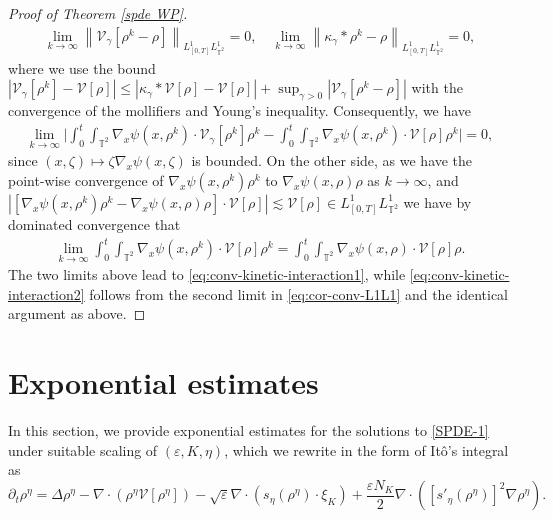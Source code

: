 \begin{proof}[Proof of Theorem \ref{spde WP}]
\begin{align}
\lim_{k \to \infty} \left\|\mathcal{V}_{\gamma}[\rho^k - \rho]\right\|_{L^1_{[0,T]}L^1_{\mathbb{T}^2}} = 0, \quad \lim_{k \to \infty} \left\|\kappa_{\gamma} \ast \rho^k - \rho\right\|_{L^1_{[0,T]}L^1_{\mathbb{T}^2}} = 0,
\end{align}
where we use the bound $|\mathcal{V}_{\gamma}[\rho^k] - \mathcal{V}[\rho]| \leq |\kappa_{\gamma} \ast \mathcal{V}[\rho] - \mathcal{V}[\rho]| + \sup_{\gamma > 0}|\mathcal{V}_{\gamma}[\rho^k - \rho]|$ with the convergence of the mollifiers and Young's inequality. Consequently, we have
\begin{align*}
\lim_{k \to \infty}\Big|\int_{0}^{t} \int_{\mathbb{T}^2} \nabla_x\psi(x, \rho^k)  \cdot \mathcal{V}_{\gamma}[\rho^k] \rho^k  - \int_{0}^{t} \int_{\mathbb{T}^2} \nabla_x\psi(x, \rho^k)  \cdot \mathcal{V}[\rho] \rho^k\Big| = 0,
\end{align*}
since $(x, \zeta) \mapsto \zeta \nabla_x\psi(x, \zeta)$ is bounded. On the other side, as we have the point-wise convergence of $\nabla_x\psi(x, \rho^k) \rho^k$ to $\nabla_x\psi(x, \rho) \rho$ as $k \to \infty$, and $\left|\left[\nabla_x\psi(x, \rho^k) \rho^k - \nabla_x\psi(x, \rho) \rho\right] \cdot \mathcal{V}[\rho]\right| \lesssim \mathcal{V}[\rho] \in L^1_{[0,T]}L^1_{\mathbb{T}^2}$
we have by dominated convergence that
\begin{align*}
\lim_{k \to \infty} \int_{0}^{t} \int_{\mathbb{T}^2} \nabla_x\psi(x, \rho^k)  \cdot \mathcal{V}[\rho] \rho^k  = \int_{0}^{t} \int_{\mathbb{T}^2} \nabla_x\psi(x, \rho)  \cdot \mathcal{V}[\rho] \rho.
\end{align*}
The two limits above lead to \eqref{eq:conv-kinetic-interaction1}, while \eqref{eq:conv-kinetic-interaction2} follows from the second limit in \eqref{eq:cor-conv-L1L1} and the identical argument as above. 
\end{proof}

\section{Exponential estimates}\label{sec-4}
In this section, we provide exponential estimates for the solutions to \eqref{SPDE-1} under suitable scaling of $(\varepsilon, K, \eta)$, which we rewrite in the form of It\^o's integral as
\begin{equation}\label{cspde}
\partial_t\rho^{\eta}=\Delta\rho^{\eta}-\nabla\cdot\left(\rho^{\eta}\mathcal{V}[\rho^{\eta}]\right)
-\sqrt{\varepsilon}\nabla\cdot\left(s_{\eta}(\rho^{\eta})\cdot\xi_{K}\right)
+\frac{\varepsilon N_{K}}{2}\nabla\cdot \left([s'_{\eta}(\rho^{\eta})]^2\nabla\rho^{\eta}\right).
\end{equation}

